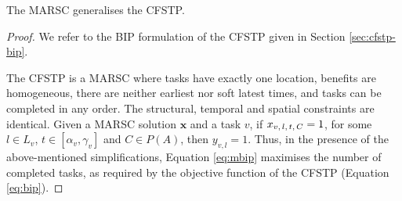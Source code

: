 \begin{theorem}\label{teo:cfstp-gen}
    The MARSC generalises the CFSTP.
\end{theorem}
\begin{proof}
We refer to the BIP formulation of the CFSTP given in Section \ref{sec:cfstp-bip}.

The CFSTP is a MARSC where tasks have exactly one location, benefits are homogeneous,
there are neither earliest nor soft latest times, and tasks can be completed in any order.
The structural, temporal and spatial constraints are identical. Given a MARSC solution
$\bm{x}$ and a task $v$, if $x_{v,\, l,\, t,\, C} = 1$, for some $l \in L_v$, $t \in [\alpha_v, \gamma_v]$
and $C \in P(A)$, then $y_{v, l} = 1$. Thus, in the presence of the above-mentioned
simplifications, Equation \ref{eq:mbip} maximises the number of completed tasks, as
required by the objective function of the CFSTP (Equation \ref{eq:bip}).
\end{proof}

